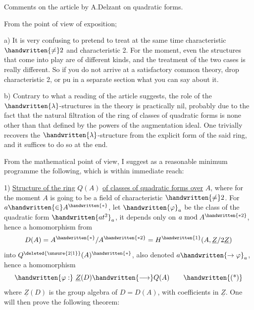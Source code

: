 \begin{flushright}\end{flushright}

\begin{center}Comments on the article by A.Delzant on quadratic forms.\end{center}

From the point of view of exposition;

a) It is very confusing to pretend to treat at the same time characteristic $\handwritten{\ne}2$ and characteristic 2. For the moment, even the structures that come into play are of different kinds, and the treatment of the two cases is really different. So if you do not arrive at a satisfactory common theory, drop characteristic 2, or pu in a separate section what you can say about it.

b) Contrary to what a reading of the article suggests, the role of the $\handwritten{\lambda}$-structures in the theory is practically nil, probably due to the fact that the natural filtration of the ring of classes of quadratic forms is none other than that defined by the powers of the augmentation ideal. One trivially recovers the $\handwritten{\lambda}$-structure from the explicit form of the said ring, and it suffices to do so at the end.

 From the mathematical point of view, I suggest as a reasonable minimum programme the following, which is within immediate reach:

1) \uline{Structure of the ring} $Q(A)$ \uline{of classes of quadratic forms over} $A$, where for the moment $A$ is going to be a field of characteristic $\handwritten{\ne}2$. For $a\handwritten{\in}A^{\handwritten{*}}$, let $\handwritten{\varphi}_a$ be the class of the quadratic form $\handwritten{at^2}_{a}$, it depends only on $a\bmod A^{\handwritten{*2}}$, hence a homomorphism from
\[
D(A)=A^{\handwritten{*}}/A^{\handwritten{*2}}=H^{\handwritten{1}}(A,\underline{Z}/2\underline{Z})
\]
into $Q^{\deleted{\unsure{2|1}}}(A)^{\handwritten{*}}$, also denoted $a\handwritten{\to\varphi}_a$, hence a homomorphism
\[
\handwritten{\varphi:}\ \underline{Z}(D)\handwritten{\longrightarrow}Q(A)
\tag*{\handwritten{(*)}}
\]
where $\underline{Z}(D)$ is the group algebra of $D=D(A)$, with coefficients in $\underline{Z}$. One will then prove the following theorem:

